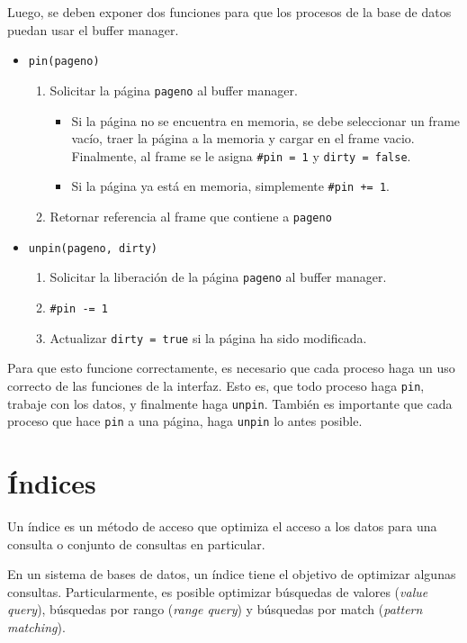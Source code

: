 Luego, se deben exponer dos funciones para que los procesos de la base de datos puedan usar el buffer manager.
\begin{itemize}
  \item \texttt{pin(pageno)}
  \begin{enumerate}
    \item Solicitar la página \texttt{pageno} al buffer manager.
    \begin{itemize}
      \item Si la página no se encuentra en memoria, se debe seleccionar un frame vacío, traer la página a la memoria y cargar en el frame vacio. Finalmente, al frame se le asigna \texttt{\#pin = 1} y \texttt{dirty = false}.
      \item Si la página ya está en memoria, simplemente \texttt{\#pin += 1}.
    \end{itemize}
    \item Retornar referencia al frame que contiene a \texttt{pageno}
  \end{enumerate}
  \item \texttt{unpin(pageno, dirty)}
  \begin{enumerate}
    \item Solicitar la liberación de la página \texttt{pageno} al buffer manager.
    \item \texttt{\#pin -= 1}
    \item Actualizar \texttt{dirty = true} si la página ha sido modificada.
  \end{enumerate}
\end{itemize}

Para que esto funcione correctamente, es necesario que cada proceso haga un uso correcto de las funciones de la interfaz. Esto es, que todo proceso haga \texttt{pin}, trabaje con los datos, y finalmente haga \texttt{unpin}. También es importante que cada proceso que hace \texttt{pin} a una página, haga \texttt{unpin} lo antes posible.


\section{Índices}
Un índice es un método de acceso que optimiza el acceso a los datos para una consulta o conjunto de consultas en particular.

En un sistema de bases de datos, un índice tiene el objetivo de optimizar algunas consultas. Particularmente, es posible optimizar búsquedas de valores (\textit{value query}), búsquedas por rango (\textit{range query}) y búsquedas por match (\textit{pattern matching}).

